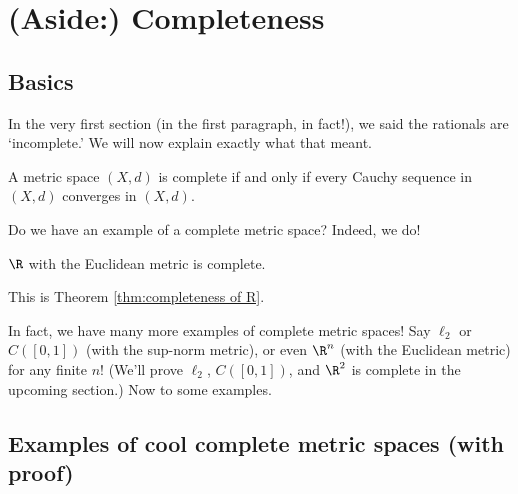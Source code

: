 \documentclass[class=article, crop=false]{standalone}
\begin{document}
\section{(Aside:) Completeness}

\subsection{Basics}

In the very first section (in the first paragraph, in fact!), we said the rationals are `incomplete.' We will now explain exactly what that meant.
\begin{defn}[Completeness]
    A metric space $(X,d)$ is complete if and only if every Cauchy sequence in $(X,d)$ converges in $(X,d)$.
\end{defn}

Do we have an example of a complete metric space? Indeed, we do!
\begin{ex}
    $\R$ with the Euclidean metric is complete.
\end{ex}
\begin{pf}
    This is Theorem \ref{thm:completeness of R}.
\end{pf}

In fact, we have many more examples of complete metric spaces! Say $\ell_2$ or $C([0,1])$ (with the sup-norm metric), or even $\R^n$ (with the Euclidean metric) for any finite $n$! (We'll prove $\ell_2$, $C([0,1])$, and $\R^2$ is complete in the upcoming section.) Now to some examples.



\subsection{Examples of cool complete metric spaces (with proof)}
\end{document}
